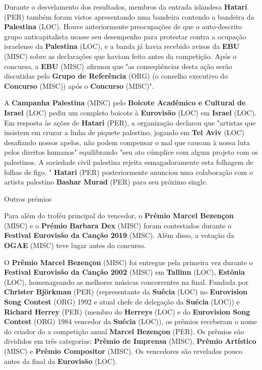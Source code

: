 \documentclass[12pt,a4paper]{article}
\begin{document}
Durante o desvelamento dos resultados, membros da entrada islandesa \textbf{Hatari} (PER) também foram vistos apresentando uma bandeira contendo a bandeira da \textbf{Palestina} (LOC). Houve anteriormente preocupações de que o auto-descrito grupo anticapitalista usasse seu desempenho para protestar contra a ocupação israelense da \textbf{Palestina} (LOC), e a banda já havia recebido avisos da \textbf{EBU} (MISC) sobre as declarações que haviam feito antes da competição. Após o concurso, a \textbf{EBU} (MISC) afirmou que "as conseqüências desta ação serão discutidas pelo \textbf{Grupo de Referência} (ORG) (o conselho executivo do \textbf{Concurso} (MISC)) após o \textbf{Concurso} (MISC)".

A \textbf{Campanha Palestina} (MISC) pelo \textbf{Boicote Acadêmico e Cultural de Israel} (LOC) pediu um completo boicote à \textbf{Eurovisão} (LOC) em \textbf{Israel} (LOC). Em resposta às ações de \textbf{Hatari} (PER), a organização declarou que "artistas que insistem em cruzar a linha de piquete palestino, jogando em \textbf{Tel Aviv} (LOC) desafiando nossos apelos, não podem compensar o mal que causam à nossa luta pelos direitos humanos" equilibrando "seu ato cúmplice com algum projeto com os palestinos. A sociedade civil palestina rejeita esmagadoramente esta folhagem de folhas de figo. " \textbf{Hatari} (PER) posteriormente anunciou uma colaboração com o artista palestino \textbf{Bashar Murad} (PER) para seu próximo single.



Outros prémios

Para além do troféu principal do vencedor, o \textbf{Prémio Marcel Bezençon} (MISC) e o \textbf{Prémio Barbara Dex} (MISC) foram contestados durante o \textbf{Festival Eurovisão da Canção 2019} (MISC). Além disso, a votação da \textbf{OGAE} (MISC) teve lugar antes do concurso.

O \textbf{Prêmio Marcel Bezençon} (MISC) foi entregue pela primeira vez durante o \textbf{Festival Eurovisão da Canção 2002} (MISC) em \textbf{Tallinn} (LOC), \textbf{Estônia} (LOC), homenageando as melhores músicas concorrentes na final. Fundada por \textbf{Christer Björkman} (PER) (representante da \textbf{Suécia} (LOC) no \textbf{Eurovision Song Contest} (ORG) 1992 e atual chefe de delegação da \textbf{Suécia} (LOC)) e \textbf{Richard Herrey} (PER) (membro do \textbf{Herreys} (LOC) e do \textbf{Eurovision Song Contest} (ORG) 1984 vencedor da \textbf{Suécia} (LOC)), os prêmios receberam o nome do criador do a competição anual \textbf{Marcel Bezençon} (PER). Os prêmios são divididos em três categorias: \textbf{Prêmio de Imprensa} (MISC), \textbf{Prêmio Artístico} (MISC) e \textbf{Prêmio Compositor} (MISC). Os vencedores são revelados pouco antes da final da \textbf{Eurovisão} (LOC).
\end{document}
